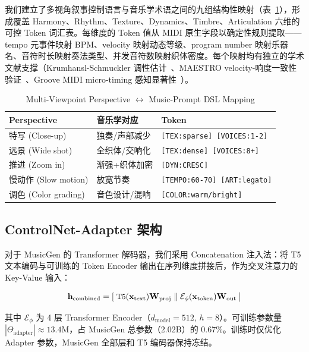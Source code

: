 \documentclass[11pt,twocolumn]{article}
\begin{document}
我们建立了多视角叙事控制语言与音乐学术语之间的九组结构性映射（表~\ref{tab:mapping}），形成覆盖 Harmony、Rhythm、Texture、Dynamics、Timbre、Articulation 六维的可控 Token 词汇表。每维度的 Token 值从 MIDI 原生字段以确定性规则提取——tempo 元事件映射 BPM、velocity 映射动态等级、program number 映射乐器名、音符时长映射奏法类型、并发音符数映射织体密度。每个映射均有独立的学术文献支撑（Krumhansl-Schmuckler 调性估计~\cite{krumhansl}、MAESTRO velocity-响度一致性验证~\cite{maestro}、Groove MIDI micro-timing 感知显著性~\cite{groove}）。

\begin{table}[t]
\centering\footnotesize
\caption{Multi-Viewpoint Perspective $\leftrightarrow$ Music-Prompt DSL Mapping}
\label{tab:mapping}
\begin{tabularx}{\columnwidth}{@{}l >{\raggedright\arraybackslash}X >{\raggedright\arraybackslash}X@{}}
\toprule
\textbf{Perspective} & \textbf{音乐学对应} & \textbf{Token} \\
\midrule
特写 (Close-up) & 独奏/声部减少 & \texttt{[TEX:sparse] [VOICES:1-2]} \\
远景 (Wide shot) & 全织体/交响化 & \texttt{[TEX:dense] [VOICES:8+]} \\
推进 (Zoom in) & 渐强+织体加密 & \texttt{[DYN:CRESC]} \\
慢动作 (Slow motion) & 放宽节奏 & \texttt{[TEMPO:60-70] [ART:legato]} \\
调色 (Color grading) & 音色设计/混响 & \texttt{[COLOR:warm/bright]} \\
\bottomrule
\end{tabularx}
\end{table}

\subsection{ControlNet-Adapter 架构}

对于 MusicGen 的 Transformer 解码器，我们采用 Concatenation 注入法：将 T5 文本编码与可训练的 Token Encoder 输出在序列维度拼接后，作为交叉注意力的 Key-Value 输入：

\begin{equation}\small
\mathbf{h}_{\text{combined}} = [\;\text{T5}(\mathbf{x}_{\text{text}})\mathbf{W}_{\text{proj}}\;\|\;
\mathcal{E}_{\phi}(\mathbf{x}_{\text{token}})\mathbf{W}_{\text{out}}\;]
\end{equation}

其中 $\mathcal{E}_{\phi}$ 为 4 层 Transformer Encoder（$d_{\text{model}}=512$, $h=8$）。可训练参数量 $|\Theta_{\text{adapter}}| \approx 13.4$M，占 MusicGen 总参数（2.02B）的 0.67\%。训练时仅优化 Adapter 参数，MusicGen 全部层和 T5 编码器保持冻结。
\end{document}
